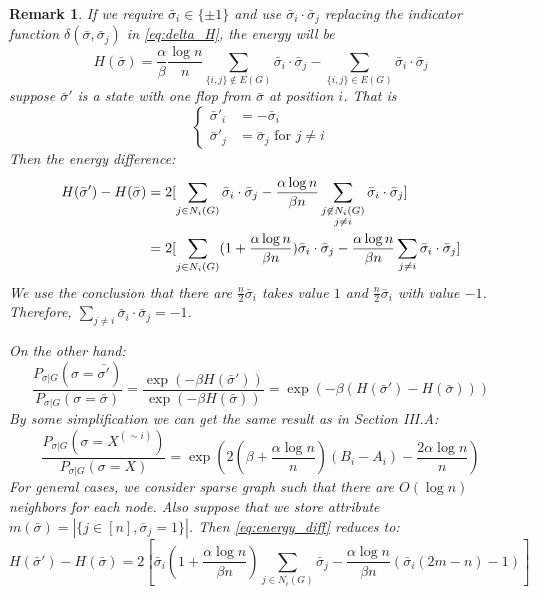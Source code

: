 \documentclass{ctexart}
\newtheorem{remark}{Remark}
\begin{document}
	\begin{remark}
	If we require $\bar{\sigma}_i \in \{\pm 1\}$ and use $\bar{\sigma}_i \cdot \bar{\sigma}_j$ replacing
	the indicator function  $\delta(\bar{\sigma},\bar{\sigma}_j)$ in \eqref{eq:delta_H}, the energy will be
	$$
	H(\bar{\sigma}) = \frac{\alpha}{\beta} \frac{\log n}{n} \sum_{\{i,j\}\not\in E(G)}\bar{\sigma}_i \cdot \bar{\sigma}_j
		- \sum_{\{i,j\}\in E(G)}\bar{\sigma}_i \cdot \bar{\sigma}_j
	 $$
	 suppose $\bar{\sigma}'$ is a state with one flop from $\bar{\sigma}$ at position $i$. That is
	 $$
	 \begin{cases}
	 \bar{\sigma}'_i &= -\bar{\sigma}_i \\
	 \bar{\sigma}'_j & = \bar{\sigma}_j \textrm{ for } j \neq i
	 \end{cases}
	 $$
	 Then the energy difference:
	 \begin{align}
	 H(\bar{\sigma}') - H(\bar{\sigma}) &= 2[\sum_{j\in N_i(G)}\bar{\sigma}_i \cdot \bar{\sigma}_j - \frac{\alpha \log n}{\beta n}
	 \sum_{\substack{j\not\in N_i(G) \\ j\neq i}} \bar{\sigma}_i \cdot \bar{\sigma}_j ] \notag\\
	 & = 2 [\sum_{j\in N_i(G)}(1+\frac{\alpha \log n}{\beta n})\bar{\sigma}_i \cdot \bar{\sigma}_j - \frac{\alpha \log n}{\beta n}
	 \sum_{j\neq i} \bar{\sigma}_i \cdot \bar{\sigma}_j ] \label{eq:energy_diff}
	 \end{align}
	 We use the conclusion that there are $\frac{n}{2} \bar{\sigma}_i$ takes value $1$ and $\frac{n}{2}\bar{\sigma}_i$ with value
	 $-1$. Therefore, $\sum_{j\neq i} \bar{\sigma}_i \cdot\bar{\sigma}_j = -1$.
	 
	 On the other hand:
	 $$
	 \frac{P_{\sigma | G}(\sigma = \bar{\sigma'})}{P_{\sigma | G}(\sigma = \bar{\sigma})}
	 = \frac{\exp(-\beta H(\bar{\sigma}'))}{\exp(-\beta H(\bar{\sigma}))} = \exp(-\beta(H(\bar{\sigma}')-H(\bar{\sigma})))
	 $$
	 By some simplification we can get the same result as \cite{ye2020exact} in Section III.A:
	 $$
	 \frac{P_{\sigma |G }(\sigma = X^{(\sim i)})}{P_{\sigma |G }(\sigma = X)}
	 = \exp(2(\beta + \frac{\alpha \log n}{n})(B_i - A_i)-\frac{2\alpha \log n}{n})
	 $$
	 For general cases, we consider sparse graph such that there are $O(\log n)$ neighbors for each node.
	 Also suppose that we store  attribute $m(\bar{\sigma})= |\{j \in [n], \bar{\sigma}_j = 1 \}|$.
	 Then \eqref{eq:energy_diff} reduces to:
	 \begin{equation}
	 H(\bar{\sigma}') - H(\bar{\sigma}) = 2 [\bar{\sigma}_i(1+\frac{\alpha \log n}{\beta n}) \sum_{j\in N_i(G)}\bar{\sigma}_j - \frac{\alpha \log n}{\beta n}
	 (\bar{\sigma}_i (2m-n)-1) ]
	 \end{equation}
	\end{remark}
\end{document}
